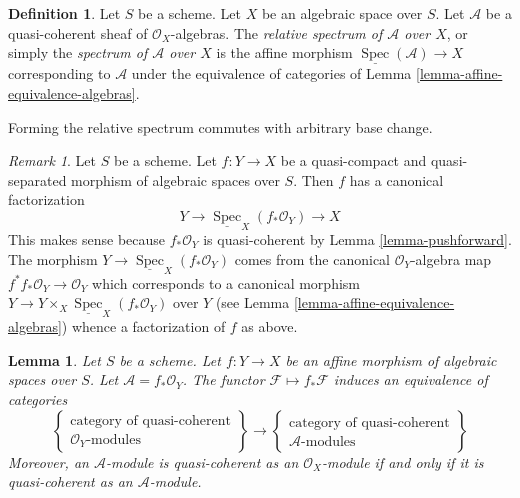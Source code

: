 \documentclass{stacks-project}
\theoremstyle{plain}
\newtheorem{lemma}[subsection]{Lemma}
\theoremstyle{definition}
\newtheorem{definition}[subsection]{Definition}
\theoremstyle{remark}
\newtheorem{remark}[subsection]{Remark}
\numberwithin{equation}{subsection}
\def\Spec{\mathop{\mathrm{Spec}}}
\begin{document}
\begin{definition}
\label{definition-relative-spec}
Let $S$ be a scheme. Let $X$ be an algebraic space over $S$.
Let $\mathcal{A}$ be a quasi-coherent sheaf of
$\mathcal{O}_X$-algebras. The {\it relative spectrum of $\mathcal{A}$ over
$X$}, or simply the {\it spectrum of $\mathcal{A}$ over $X$} is the
affine morphism $\underline{\Spec}(\mathcal{A}) \to X$
corresponding to $\mathcal{A}$ under the equivalence of categories of
Lemma \ref{lemma-affine-equivalence-algebras}.
\end{definition}

\noindent
Forming the relative spectrum commutes with arbitrary base change.

\begin{remark}
\label{remark-factorization-quasi-compact-quasi-separated}
Let $S$ be a scheme. Let $f : Y \to X$ be a quasi-compact and
quasi-separated morphism of algebraic spaces over $S$. Then
$f$ has a canonical factorization
$$
Y \longrightarrow \underline{\Spec}_X(f_*\mathcal{O}_Y) \longrightarrow X
$$
This makes sense because $f_*\mathcal{O}_Y$ is quasi-coherent
by Lemma \ref{lemma-pushforward}. The morphism
$Y \to \underline{\Spec}_X(f_*\mathcal{O}_Y)$ comes from
the canonical $\mathcal{O}_Y$-algebra map
$f^*f_*\mathcal{O}_Y \to \mathcal{O}_Y$ which corresponds to
a canonical morphism
$Y \to Y \times_X \underline{\Spec}_X(f_*\mathcal{O}_Y)$ over $Y$ (see
Lemma \ref{lemma-affine-equivalence-algebras}) whence a factorization
of $f$ as above.
\end{remark}

\begin{lemma}
\label{lemma-affine-equivalence-modules}
Let $S$ be a scheme.
Let $f : Y \to X$ be an affine morphism of algebraic spaces over $S$.
Let $\mathcal{A} = f_*\mathcal{O}_Y$.
The functor $\mathcal{F} \mapsto f_*\mathcal{F}$ induces
an equivalence of categories
$$
\left\{
\begin{matrix}
\text{category of quasi-coherent}\\
\mathcal{O}_Y\text{-modules}
\end{matrix}
\right\}
\longrightarrow
\left\{
\begin{matrix}
\text{category of quasi-coherent}\\
\mathcal{A}\text{-modules}
\end{matrix}
\right\}
$$
Moreover, an $\mathcal{A}$-module is
quasi-coherent as an $\mathcal{O}_X$-module if and only if
it is quasi-coherent as an $\mathcal{A}$-module.
\end{lemma}
\end{document}
